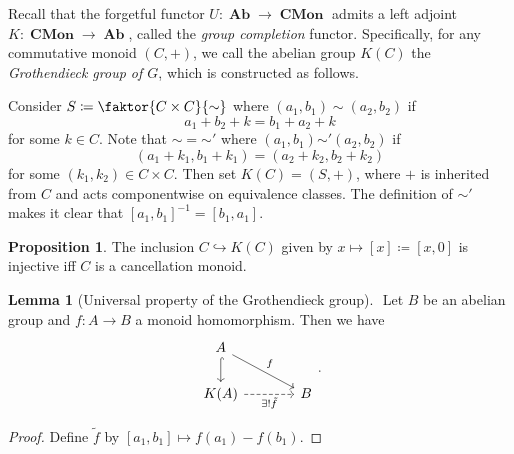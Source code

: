 \documentclass[10pt,letterpaper,cm]{nupset}
\theoremstyle{definition}
\theoremstyle{theorem}
\newtheorem{lemma}[theorem]{Lemma}
\newtheorem{prop}[theorem]{Proposition}
\theoremstyle{remark}
\newcommand{\1}{\mathbf{1}}
\newcommand{\0}{\vec 0}
\DeclareMathOperator{\Ab}{\mathbf{Ab}}
\DeclareMathOperator{\Cmon}{\mathbf{CMon}}
\begin{document}
\begin{abstract}
We begin low-dimensional $K$-theory, i.e., describe $K_0(-)$, $K_1(-)$, and $K_2(-)$, in various settings. The main sources for this talk are the following.
\begin{itemize}
\item $n$Lab.
\item Charles Weibel's \textit{The $K$-book: an introduction to algebraic $K$-theory}, Chapters I and II.
\item Eric M. Friedlander's \textit{An Introduction to $K$-theory}, Chapter 1.
\end{itemize}
\end{abstract}

\smallskip

Recall that the forgetful functor $U: \Ab \to \Cmon$ admits a left adjoint $K: \Cmon \to \Ab$, called the \textit{group completion} functor. Specifically, for any commutative monoid $\left(C, +\right)$, we call the abelian group $K(C)$ the \textit{Grothendieck group of $G$}, which is constructed as follows.

\medskip

 Consider $S\coloneqq \faktor{C \times C}{\sim}$ where $(a_1, b_1) \sim (a_2, b_2)$ if $$a_1 + b_2 +k = b_1 + a_2 +k$$ for some $k\in C$. Note that $\sim = {\sim'}$ where $(a_1, b_1) {\sim'} (a_2, b_2)$ if $$\left(a_1 + k_1, b_1 + k_1\right) = \left(a_2 +k_2, b_2 + k_2\right)$$ for some $\left(k_1, k_2\right) \in C\times C$. Then set $K(C) = \left(S, +\right)$, where $+$ is inherited from $C$ and acts componentwise on equivalence classes. The definition of ${\sim'}$ makes it clear that $\left[a_1, b_1\right]^{{-}1} = \left[b_1, a_1\right]$.

\begin{prop}
The inclusion $C \hookrightarrow K(C)$ given by $x \mapsto [x]\coloneqq \left[x, 0\right]$ is injective iff $C$ is a cancellation monoid.
\end{prop}

\begin{lemma}[Universal property of the Grothendieck group] $ $
Let $B$ be an abelian group and $f: A \to B$ a monoid homomorphism. Then we have 
\[
\begin{tikzcd}[column sep=large]
A \arrow[rd, "f"] \arrow[d, hook] &  \\
K(A) \arrow[swap, r, "\exists! \tilde{f}", dashed] & B
\end{tikzcd}.
\]
\end{lemma}
\begin{proof}
Define $\tilde{f}$ by $[a_1, b_1]\mapsto f(a_1) - f(b_1)$.
\end{proof}
\end{document}
